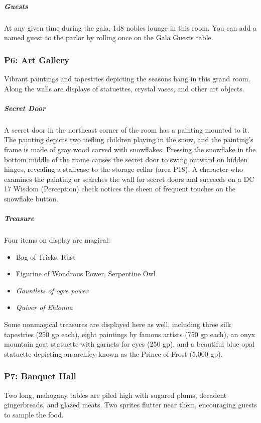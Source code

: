 \documentclass[10pt,a4paper,twoside,bg=print,twocolumn,openany,nodeprecatedcode]{dndbook}
\begin{document}
\subparagraph{Guests}
At any given time during the gala, 1d8 nobles lounge in this room. You can add a named guest to the parlor by rolling once on the Gala Guests table.

\subsubsection{P6: Art Gallery}
\begin{DndReadAloud}{}
Vibrant paintings and tapestries depicting the seasons hang in this grand room. Along the walls are displays of statuettes, crystal vases, and other art objects.

\end{DndReadAloud}

\subparagraph{Secret Door}
A secret door in the northeast corner of the room has a painting mounted to it. The painting depicts two tiefling children playing in the snow, and the painting's frame is made of gray wood carved with snowflakes. Pressing the snowflake in the bottom middle of the frame causes the secret door to swing outward on hidden hinges, revealing a staircase to the storage cellar (area P18). A character who examines the painting or searches the wall for secret doors and succeeds on a DC 17 Wisdom (Perception) check notices the sheen of frequent touches on the snowflake button.

\subparagraph{Treasure}
Four items on display are magical:


\begin{itemize}
\item Bag of Tricks, Rust
\item Figurine of Wondrous Power, Serpentine Owl
\item \textit{Gauntlets of ogre power}
\item \textit{Quiver of Ehlonna}
\end{itemize}

Some nonmagical treasures are displayed here as well, including three silk tapestries (250 gp each), eight paintings by famous artists (750 gp each), an onyx mountain goat statuette with garnets for eyes (250 gp), and a beautiful blue opal statuette depicting an archfey known as the Prince of Frost (5,000 gp).

\subsubsection{P7: Banquet Hall}
\begin{DndReadAloud}{}
Two long, mahogany tables are piled high with sugared plums, decadent gingerbreads, and glazed meats. Two sprites flutter near them, encouraging guests to sample the food.

\end{DndReadAloud}
\end{document}
